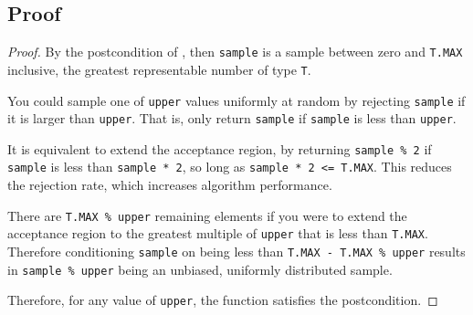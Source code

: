 \documentclass{article}
\begin{document}
\subsection{Proof} 
\begin{proof}  
\label{unsigned-integer-proof} 
By the postcondition of , 
then \texttt{sample} is a sample between zero and \texttt{T.MAX} inclusive, the greatest representable number of type \texttt{T}. 
 
You could sample one of \texttt{upper} values uniformly at random by rejecting \texttt{sample} if it is larger than \texttt{upper}. 
That is, only return \texttt{sample} if \texttt{sample} is less than \texttt{upper}. 
 
It is equivalent to extend the acceptance region,  
by returning \texttt{sample \% 2} if \texttt{sample} is less than \texttt{sample * 2},  
so long as \texttt{sample * 2 <= T.MAX}. 
This reduces the rejection rate, which increases algorithm performance. 
 
There are \texttt{T.MAX \% upper} remaining elements if you were to  
extend the acceptance region to the greatest multiple of \texttt{upper} that is less than \texttt{T.MAX}. 
Therefore conditioning \texttt{sample} on being less than \texttt{T.MAX - T.MAX \% upper}  
results in \texttt{sample \% upper} being an unbiased, uniformly distributed sample. 
 
\noindent Therefore, for any value of \texttt{upper}, the function satisfies the postcondition. 
\end{proof} 
 
\end{document}
